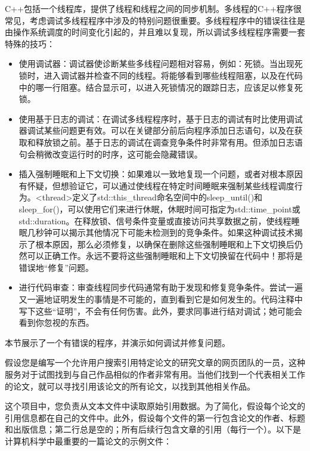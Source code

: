 
C++包括一个线程库，提供了线程和线程之间的同步机制。多线程的C++程序很常见，考虑调试多线程程序中涉及的特别问题很重要。多线程程序中的错误往往是由操作系统调度的时间变化引起的，并且难以复现，所以调试多线程程序需要一套特殊的技巧：

\begin{itemize}
\item
使用调试器：调试器使诊断某些多线程问题相对容易，例如：死锁。当出现死锁时，进入调试器并检查不同的线程。将能够看到哪些线程阻塞，以及在代码中的哪一行阻塞。结合显示可，以进入死锁情况的跟踪日志，应该足以修复死锁。

\item
使用基于日志的调试：在调试多线程程序时，基于日志的调试有时比使用调试器调试某些问题更有效。可以在关键部分前后向程序添加日志语句，以及在获取和释放锁之前。基于日志的调试在调查竞争条件时非常有用。但添加日志语句会稍微改变运行时的时序，这可能会隐藏错误。

\item
插入强制睡眠和上下文切换：如果难以一致地复现一个问题，或者对根本原因有怀疑，但想验证它，可以通过使线程在特定时间睡眠来强制某些线程调度行为。<thread>定义了std::this\_thread命名空间中的sleep\_until()和sleep\_for()，可以使用它们来进行休眠，休眠时间可指定为std::time\_point或std::duration。在释放锁、信号条件变量或直接访问共享数据之前，使线程睡眠几秒钟可以揭示其他情况下可能未检测到的竞争条件。如果这种调试技术揭示了根本原因，那么必须修复，以确保在删除这些强制睡眠和上下文切换后仍然可以正确工作。永远不要将这些强制睡眠和上下文切换留在代码中！那将是错误地“修复”问题。

\item
进行代码审查：审查线程同步代码通常有助于发现和修复竞争条件。尝试一遍又一遍地证明发生的事情是不可能的，直到看到它是如何发生的。代码注释中写下这些“证明”，不会有任何伤害。此外，要求同事进行结对调试；她可能会看到你忽视的东西。
\end{itemize}


本节展示了一个有错误的程序，并演示如何调试并修复问题。

假设您是编写一个允许用户搜索引用特定论文的研究文章的网页团队的一员，这种服务对于试图找到与自己作品相似的作者非常有用。当他们找到一个代表相关工作的论文，就可以寻找引用该论文的所有论文，以找到其他相关作品。

这个项目中，您负责从文本文件中读取原始引用数据。为了简化，假设每个论文的引用信息都在自己的文件中。此外，假设每个文件的第一行包含论文的作者、标题和出版信息；第二行总是空的；所有后续行包含文章的引用（每行一个）。以下是计算机科学中最重要的一篇论文的示例文件：


